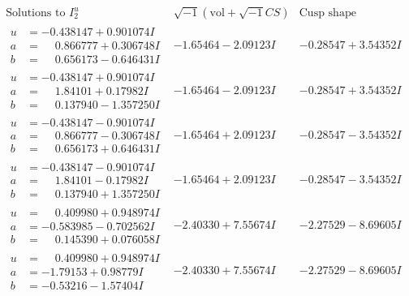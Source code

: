 \documentclass[1p]{elsarticle_modified}
\theoremstyle{definition}
\newcommand{\I}{\sqrt{-1}}
\begin{document}
$$\begin{array}{c|c|c}  
\text{Solutions to }I^u_{2}& \I (\text{vol} + \sqrt{-1}CS) & \text{Cusp shape}\\
 \hline 
\begin{aligned}
u &= -0.438147 + 0.901074 I \\
a &= \phantom{-}0.866777 + 0.306748 I \\
b &= \phantom{-}0.656173 - 0.646431 I\end{aligned}
 & -1.65464 - 2.09123 I & -0.28547 + 3.54352 I \\ \hline\begin{aligned}
u &= -0.438147 + 0.901074 I \\
a &= \phantom{-}1.84101 + 0.17982 I \\
b &= \phantom{-}0.137940 - 1.357250 I\end{aligned}
 & -1.65464 - 2.09123 I & -0.28547 + 3.54352 I \\ \hline\begin{aligned}
u &= -0.438147 - 0.901074 I \\
a &= \phantom{-}0.866777 - 0.306748 I \\
b &= \phantom{-}0.656173 + 0.646431 I\end{aligned}
 & -1.65464 + 2.09123 I & -0.28547 - 3.54352 I \\ \hline\begin{aligned}
u &= -0.438147 - 0.901074 I \\
a &= \phantom{-}1.84101 - 0.17982 I \\
b &= \phantom{-}0.137940 + 1.357250 I\end{aligned}
 & -1.65464 + 2.09123 I & -0.28547 - 3.54352 I \\ \hline\begin{aligned}
u &= \phantom{-}0.409980 + 0.948974 I \\
a &= -0.583985 - 0.702562 I \\
b &= \phantom{-}0.145390 + 0.076058 I\end{aligned}
 & -2.40330 + 7.55674 I & -2.27529 - 8.69605 I \\ \hline\begin{aligned}
u &= \phantom{-}0.409980 + 0.948974 I \\
a &= -1.79153 + 0.98779 I \\
b &= -0.53216 - 1.57404 I\end{aligned}
 & -2.40330 + 7.55674 I & -2.27529 - 8.69605 I \\ \hline\begin{aligned}

\end{aligned}
\end{array}$$
\end{document}
